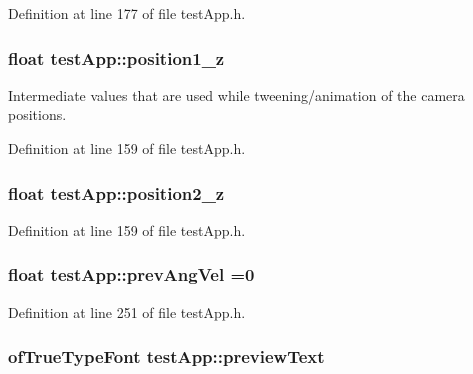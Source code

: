 Definition at line 177 of file test\-App.\-h.

\hypertarget{classtest_app_a808376783cdf510335cd1b37026e9bb3}{
\subsubsection[{position1\-\_\-z}]{\setlength{\rightskip}{0pt plus 5cm}float test\-App\-::position1\-\_\-z}}\label{classtest_app_a808376783cdf510335cd1b37026e9bb3}


Intermediate values that are used while tweening/animation of the camera positions. 



Definition at line 159 of file test\-App.\-h.

\hypertarget{classtest_app_a0720011cfaade6388109232ea4927c19}{
\subsubsection[{position2\-\_\-z}]{\setlength{\rightskip}{0pt plus 5cm}float test\-App\-::position2\-\_\-z}}\label{classtest_app_a0720011cfaade6388109232ea4927c19}


Definition at line 159 of file test\-App.\-h.

\hypertarget{classtest_app_a8a2b9b9cf76097e20f148b616297029b}{
\subsubsection[{prev\-Ang\-Vel}]{\setlength{\rightskip}{0pt plus 5cm}float test\-App\-::prev\-Ang\-Vel =0}}\label{classtest_app_a8a2b9b9cf76097e20f148b616297029b}


Definition at line 251 of file test\-App.\-h.

\hypertarget{classtest_app_af5b1af55af2256ef3751de075fc7a9cc}{
\subsubsection[{preview\-Text}]{\setlength{\rightskip}{0pt plus 5cm}of\-True\-Type\-Font test\-App\-::preview\-Text}}\label{classtest_app_af5b1af55af2256ef3751de075fc7a9cc}


